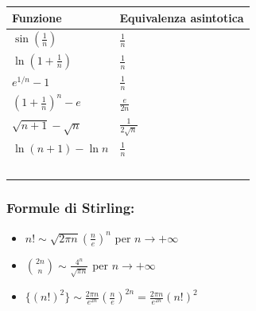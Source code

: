 \documentclass[10pt, a4paper]{article}
\begin{document}
\begin{center}
\begin{tabular}{|ll|}
                \hline
                \textbf{Funzione} & \textbf{Equivalenza asintotica} \\
                \hline
                $\displaystyle\sin\left(\frac{1}{n}\right)$ & $\displaystyle\frac{1}{n}$ \\
                \hline
                $\displaystyle\ln\left(1+\frac{1}{n}\right)$ & $\displaystyle\frac{1}{n}$ \\
                \hline
                $\displaystyle e^{1/n} - 1$ & $\displaystyle\frac{1}{n}$ \\
                \hline
                $\displaystyle\left(1+\frac{1}{n}\right)^n - e$ & $\displaystyle\frac{e}{2n}$ \\
                \hline
                $\displaystyle\sqrt{n+1} - \sqrt{n}$ & $\displaystyle\frac{1}{2\sqrt{n}}$ \\
                \hline
                $\displaystyle\ln(n+1) - \ln n$ & $\displaystyle\frac{1}{n}$ \\
                \hline
                &\\
                \hline
                &\\
                \hline
                &\\
                \hline
                &\\
                \hline
                &\\
                \hline
            \end{tabular}
        \end{center}

        \subsubsection*{Formule di Stirling:}
        \begin{itemize}
            \item $n! \sim \sqrt{2\pi n}\left(\frac{n}{e}\right)^n$ per $n \to +\infty$
            \item $\binom{2n}{n} \sim \frac{4^n}{\sqrt{\pi n}}$ per $n \to +\infty$
            \item $\{(n!)^2\} \sim \frac{2\pi n}{e^{2n}}\left(\frac{n}{e}\right)^{2n} = \frac{2\pi n}{e^{2n}}(n!)^2$
        \end{itemize}
\end{document}
